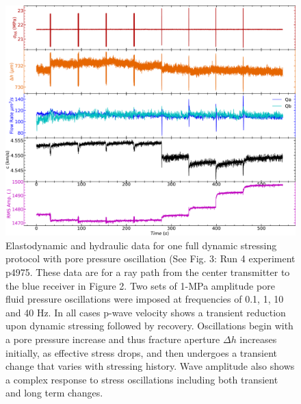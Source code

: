 \documentclass[letterpaper,10pt]{article}
\begin{document}
\newpage

\begin{figure}[ht]
	\centering
	\includegraphics[width=1\columnwidth]{NS_p4975_run4}
	\caption{Elastodynamic and hydraulic data for one full dynamic stressing protocol with pore pressure oscillation (See Fig. 3: Run 4 experiment p4975. These data are for a ray path from the center transmitter to the blue receiver in Figure 2. Two sets of 1-MPa amplitude pore fluid pressure oscillations were imposed at frequencies of 0.1, 1, 10 and 40 Hz. In all cases p-wave velocity shows a transient reduction upon dynamic stressing followed by recovery. Oscillations begin with a pore pressure increase and thus fracture aperture $\Delta h$ increases initially, as effective stress drops, and then undergoes a transient change that varies with stressing history. Wave amplitude also shows a complex response to stress oscillations including both transient and long term changes. }
	\label{fig:run4_p4975}
\end{figure}

\newpage
\end{document}
